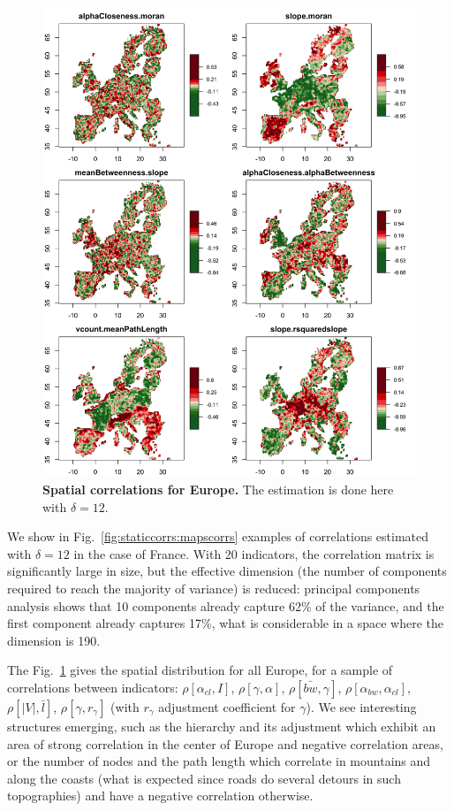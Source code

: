 \documentclass[11pt]{article}
\newcommand{\rhob}[2]{\ensuremath{\rho\!\left[#1,#2\right]}}
\begin{document}
\begin{figure}
	\includegraphics[width=\linewidth]{A-staticcorrelations-europe-correlations.jpg}
\caption{\textbf{Spatial correlations for Europe.} The estimation is done here with $\delta = 12$.\label{fig:app:staticcorrelations:europe-correlations}}
\end{figure}



We show in Fig.~\ref{fig:staticcorrs:mapscorrs} examples of correlations estimated with $\delta = 12$ in the case of France. With 20 indicators, the correlation matrix is significantly large in size, but the effective dimension (the number of components required to reach the majority of variance) is reduced:  principal components analysis shows that 10 components already capture 62\% of the variance, and the first component already captures 17\%, what is considerable in a space where the dimension is 190.

The Fig.~\ref{fig:app:staticcorrelations:europe-correlations} gives the spatial distribution for all Europe, for a sample of correlations between indicators: $\rhob{\alpha_{cl}}{I}$, $\rhob{\gamma}{\alpha}$, $\rhob{\bar{bw}}{\gamma}$, $\rhob{\alpha_{bw}}{\alpha_{cl}}$, $\rhob{\left|V\right|}{\bar{l}}$, $\rhob{\gamma}{r_{\gamma}}$ (with $r_{\gamma}$ adjustment coefficient for $\gamma$). We see interesting structures emerging, such as the hierarchy and its adjustment which exhibit an area of strong correlation in the center of Europe and negative correlation areas, or the number of nodes and the path length which correlate in mountains and along the coasts (what is expected since roads do several detours in such topographies) and have a negative correlation otherwise.
\end{document}
